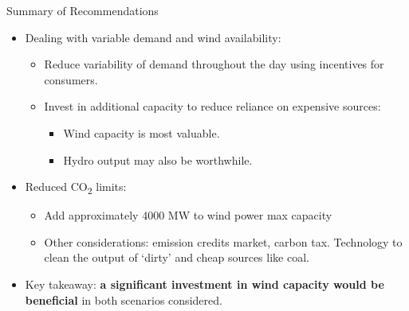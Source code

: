 \documentclass{beamer}
\begin{document}
    \begin{frame}{Summary of Recommendations}
    
    	\begin{itemize}
        
        	\item Dealing with variable demand and wind availability:

                \begin{itemize}

                    \item Reduce variability of demand throughout the day using incentives for consumers.

                    \item Invest in additional capacity to reduce reliance on expensive sources:
                    
                    \begin{itemize}
                    	
                        \item Wind capacity is most valuable.
                        
                        \item Hydro output may also be worthwhile.
                        
                    \end{itemize}

                \end{itemize}
        
        	\item Reduced CO\textsubscript{2} limits:

                \begin{itemize}

                    \item Add approximately 4000 MW to wind power max capacity
                    
                    \item Other considerations: emission credits market, carbon tax.  Technology to clean the output of `dirty' and cheap sources like coal.

                \end{itemize}
        
        	\item Key takeaway: \textbf{a significant investment in wind capacity would be beneficial} in both scenarios considered.
        
        \end{itemize}
        
    \end{frame}
    
    
        
\end{document}
